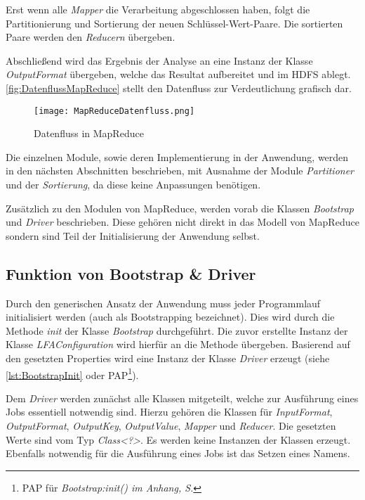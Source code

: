 Erst wenn alle \textit{Mapper} die Verarbeitung abgeschlossen haben, folgt die Partitionierung und Sortierung der neuen Schlüssel-Wert-Paare. Die sortierten Paare werden den \textit{Reducern} übergeben.

Abschließend wird das Ergebnis der Analyse an eine Instanz der Klasse \textit{OutputFormat} übergeben, welche das Resultat aufbereitet und im \ac{HDFS} ablegt. \autoref{fig:DatenflussMapReduce} stellt den Datenfluss zur Verdeutlichung grafisch dar.

\newpage
\begin{figure}[h]
	\centering
	\texttt{[image: MapReduceDatenfluss.png]}
	\caption{Datenfluss in MapReduce\footnotemark}
	\label{fig:DatenflussMapReduce}
\end{figure}

Die einzelnen Module, sowie deren Implementierung in der Anwendung, werden in den nächsten Abschnitten beschrieben, mit Ausnahme der Module \textit{Partitioner} und der \textit{Sortierung}, da diese keine Anpassungen benötigen.

Zusätzlich zu den Modulen von MapReduce, werden vorab die Klassen \textit{Bootstrap} und \textit{Driver} beschrieben. Diese gehören nicht direkt in das Modell von MapReduce sondern sind Teil der Initialisierung der Anwendung selbst.

\subsection{Funktion von Bootstrap \& Driver}
Durch den generischen Ansatz der Anwendung muss jeder Programmlauf initialisiert werden (auch als \gls{Bootstrapping} bezeichnet). Dies wird durch die Methode \textit{init} der Klasse \textit{Bootstrap} durchgeführt. Die zuvor erstellte Instanz der Klasse \textit{LFAConfiguration} wird hierfür an die Methode übergeben. Basierend auf den gesetzten Properties wird eine Instanz der Klasse \textit{Driver} erzeugt (siehe \autoref{lst:BootstrapInit} oder \ac{PAP}\footnote{\ac{PAP} für \textit{Bootstrap:init() im Anhang, S. \pageref{subsec:PAPBootstrapInit}}}).

Dem \textit{Driver} werden zunächst alle Klassen mitgeteilt, welche zur Ausführung eines Jobs essentiell notwendig sind. Hierzu gehören die Klassen für \textit{InputFormat}, \textit{OutputFormat}, \textit{OutputKey}, \textit{OutputValue}, \textit{Mapper} und \textit{Reducer}. Die gesetzten Werte sind vom Typ \textit{Class<?>}. Es werden keine Instanzen der Klassen erzeugt. Ebenfalls notwendig für die Ausführung eines Jobs ist das Setzen eines Namens.

